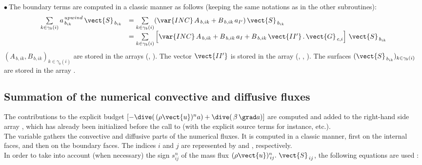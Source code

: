 $\bullet \ $The boundary terms are computed in a classic manner as follows (keeping the same notations as in the other subroutines):
\begin{equation}\notag
\begin{array}{ll}
\sum\limits_{k\in {\gamma_b(i)}}a^{\,upwind}_{\,b_{ik}}\,\vect{S}_{\,{b}_{ik}}
& = \sum\limits_{k\in {\gamma_b(i)}}(\var{INC}\,A_{\,b,ik} + B_{\,b,ik}\,a_{I'})\,\vect{S}_{\,{b}_{ik}}\\
&=\sum\limits_{k\in {\gamma_b(i)}}\left[ \var{INC}\,A_{\,b,ik} +
B_{\,b,ik}\,a_{I} + B_{\,b,ik}\,\vect {II'}\,.\,\vect{G}_{\,c,i}
\right]\,\vect{S}_{\,{b}_{ik}}
\end{array}
\end{equation}
$(A_{\,b,ik},
B_{\,b,ik})_{k\in {\gamma_b(i)}}$ are stored in the arrays (, ). The vector  $\vect{II'}$ is stored in the array (, ,
). The surfaces  $(\vect{S}_{\,{b}_{ik}})_{k\in {\gamma_b(i)}}$ are stored in the array  .

\subsection*{\bf Summation of the numerical convective and diffusive fluxes}
The contributions to the explicit budget $[-\dive(\,(\rho \vect{u})^{n}a)
+\dive(\,\beta\,\grad a)]$ are computed and added to the right-hand side array ,
which has already been initialized before the call to 
 (with the explicit source terms for instance, etc.).\\
The variable  gathers the convective and diffusive parts of the numerical fluxes. It is computed in a classic manner, first on the internal faces, and then on the boundary faces.    
The indices $i$ and $j$ are represented by  and , respectively.\\
In order to take into account (when necessary) the sign $s^n_{ij}$ of 
the mass flux $(\rho\vect{u})_{\,ij}^n.\ \vect{S}_{\,ij}$, the following equations are used :

